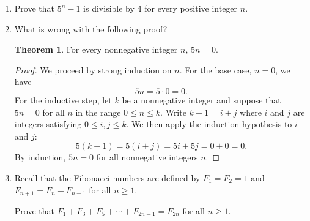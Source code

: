 \documentclass[12pt]{report}
\theoremstyle{definition}
\newtheorem{thm}{Theorem}
\begin{document}
\begin{enumerate}
\item Prove that $5^n-1$ is divisible by 4 for every positive integer $n$.
\vfill\null\pagebreak



\item What is wrong with the following proof?

\begin{thm}
	For every nonnegative integer $n$, $5n=0$.
\end{thm}

\begin{proof}
	We proceed by strong induction on $n$.
	For the base case, $n=0$, we have
	\begin{equation}
		5n = 5\cdot 0 = 0.
	\end{equation}
	For the inductive step, let $k$ be a nonnegative integer and suppose that $5n=0$ for all $n$ in the range $0\leq n\leq k$. Write $k+1 = i+j$ where $i$ and $j$ are integers satisfying $0\leq i,j\leq k$. We then apply the induction hypothesis to $i$ and $j$:
	\begin{equation}
		5(k+1) = 5(i+j) = 5i+5j = 0+0 = 0.
	\end{equation}
	By induction, $5n=0$ for all nonnegative integers $n$.
\end{proof}
\vfill

\item Recall that the Fibonacci numbers are defined by $F_1 = F_2 = 1$ and $F_{n+1} = F_n + F_{n-1}$ for all $n\geq 1$.

Prove that $F_1 + F_3 + F_5 + \cdots + F_{2n-1} = F_{2n}$ for all $n\geq 1$.
\vfill

\end{enumerate}
\end{document}
